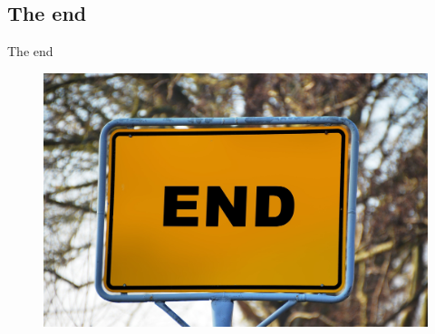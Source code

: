 \subsection{The end}

\begin{frame}{The end}
  \begin{figure}[!ht]
     \centering
     \includegraphics[width=0.8\linewidth]{img/town-sign-1158385_1920.jpg}
  \end{figure}
\end{frame}



